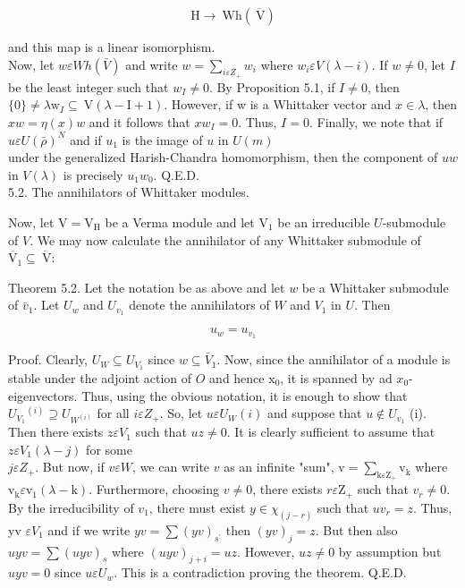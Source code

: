 \documentclass[10pt]{article}
\begin{document}
\begin{equation*}
\mathrm{H} \rightarrow \mathrm{~Wh}(\overline{\mathrm{~V}}) \tag{5.1.10}
\end{equation*}


and this map is a linear isomorphism.\\
Now, let $w \varepsilon W h(\bar{V})$ and write $w=\sum_{i \varepsilon Z_{+}} w_{i}$ where $w_{i} \varepsilon V(\lambda-i)$. If $w \neq 0$, let $I$ be the least integer such that $w_{I} \neq 0$. By Proposition 5.1, if $I \neq 0$, then $\{0\} \neq \lambda \mathrm{w}_{I} \subseteq \mathrm{~V}(\lambda-\mathrm{I}+1)$. However, if w is a Whittaker vector and $x \in \lambda$, then $x w=\eta(x) w$ and it follows that $x w_{I}=0$. Thus, $I=0$. Finally, we note that if $u \varepsilon U(\bar{\rho})^{N}$ and if $u_{1}$ is the image of $u$ in $U(m)$\\
under the generalized Harish-Chandra homomorphism, then the component of $u w$ in $V(\lambda)$ is precisely $u_{1} w_{0}$. Q.E.D.\\
5.2. The annihilators of Whittaker modules.

Now, let $\mathrm{V}=\mathrm{V}_{\mathrm{H}}$ be a Verma module and let $\mathrm{V}_{1}$ be an irreducible $U$-submodule of $V$. We may now calculate the annihilator of any Whittaker submodule of $\overline{\mathrm{V}}_{1} \subseteq \overline{\mathrm{~V}}:$

Theorem 5.2. Let the notation be as above and let $w$ be a Whittaker submodule of $\bar{v}_{1}$. Let $U_{w}$ and $U_{v_{1}}$ denote the annihilators of $W$ and $V_{1}$ in $U$. Then


\begin{equation*}
u_{w}=u_{v_{1}} \tag{5.2.1}
\end{equation*}


Proof. Clearly, $U_{W} \subseteq U_{V_{1}}$ since $w \subseteq \bar{V}_{1}$. Now, since the annihilator of a module is stable under the adjoint action of $O$ and hence $\mathrm{x}_{0}$, it is spanned by ad $x_{0}$-eigenvectors. Thus, using the obvious notation, it is enough to show that $U_{V_{1}}{ }^{(i)} \supseteq U_{W^{(i)}}$ for all $i \varepsilon Z_{+}$. So, let $u \varepsilon U_{W}(i)$ and suppose that $u \notin U_{v_{1}}$ (i). Then there exists $z \varepsilon V_{1}$ such that $u z \neq 0$. It is clearly sufficient to assume that $z \varepsilon V_{1}(\lambda-j)$ for some\\
$j \varepsilon Z_{+}$. But now, if $v \varepsilon W$, we can write $v$ as an infinite "sum", $\mathrm{v}=\sum_{\mathrm{k} \varepsilon \mathrm{Z}_{+}} \mathrm{v}_{\mathrm{k}}$ where $\mathrm{v}_{\mathrm{k}} \varepsilon \mathrm{v}_{1}(\lambda-\mathrm{k})$. Furthermore, choosing $v \neq 0$, there exists $r \varepsilon \mathrm{Z}_{+}$ such that $v_{r} \neq 0$. By the irreducibility of $v_{1}$, there must exist $y \in \chi_{(j-r)}$ such that $u v_{r}=z$. Thus, yv $\varepsilon V_{1}$ and if we write $y v=\sum(y v)_{s^{\prime}}$ then $(y v)_{j}=z$. But then also $u y v=\sum(u y v)_{s}$ where $(u y v)_{j+i}=u z$. However, $u z \neq 0$ by assumption but $u y v=0$ since $u \varepsilon U_{w}$. This is a contradiction proving the theorem. Q.E.D.
\end{document}
